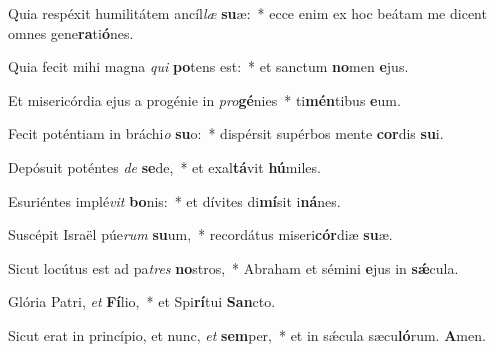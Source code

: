 ﻿\item Quia respéxit humilitátem ancíl\textit{læ} \textbf{su}æ:~* ecce enim ex hoc beátam me dicent omnes gene\textbf{ra}ti\textbf{ó}nes.
\item Quia fecit mihi magna \textit{qui} \textbf{po}tens est:~* et sanctum \textbf{no}men \textbf{e}jus.
\item Et misericórdia ejus a progénie in \textit{pro}\textbf{gé}nies~* ti\textbf{mén}tibus \textbf{e}um.
\item Fecit poténtiam in bráchi\textit{o} \textbf{su}o:~* dispérsit supérbos mente \textbf{cor}dis \textbf{su}i.
\item Depósuit poténtes \textit{de} \textbf{se}de,~* et exal\textbf{tá}vit \textbf{hú}miles.
\item Esuriéntes implé\textit{vit} \textbf{bo}nis:~* et dívites di\textbf{mí}sit i\textbf{ná}nes.
\item Suscépit Israël púe\textit{rum} \textbf{su}um,~* recordátus miseri\textbf{cór}diæ \textbf{su}æ.
\item Sicut locútus est ad pa\textit{tres} \textbf{no}stros,~* Abraham et sémini \textbf{e}jus in \textbf{sǽ}cula.
\item Glória Patri, \textit{et} \textbf{Fí}lio,~* et Spi\textbf{rí}tui \textbf{San}cto.
\item Sicut erat in princípio, et nunc, \textit{et} \textbf{sem}per,~* et in sǽcula sæcu\textbf{ló}rum. \textbf{A}men.
